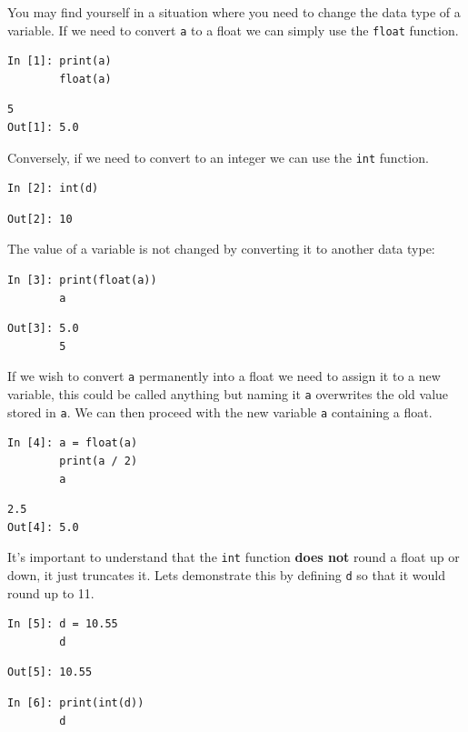 You may find yourself in a situation where you need to change the data type of a variable. If we need to convert \texttt{a} to a float we can simply use the \texttt{float} function.
\begin{lstlisting}[style=PY]
In [1]: print(a)
        float(a)
\end{lstlisting}
\begin{lstlisting}[style=PY, backgroundcolor=\color{white}]
        5
Out[1]: 5.0
\end{lstlisting}
Conversely, if we need to convert to an integer we can use the \texttt{int} function.
\begin{lstlisting}[style=PY]
In [2]: int(d)
\end{lstlisting}
\begin{lstlisting}[style=PY, backgroundcolor=\color{white}]
Out[2]: 10
\end{lstlisting}
The value of a variable is not changed by converting it to another data type:
\begin{lstlisting}[style=PY]
In [3]: print(float(a))
        a
\end{lstlisting}
\begin{lstlisting}[style=PY, backgroundcolor=\color{white}]
Out[3]: 5.0
        5
\end{lstlisting}
If we wish to convert \texttt{a} permanently into a float we need to assign it to a new variable, this could be called anything but naming it \texttt{a} overwrites the old value stored in \texttt{a}. We can then proceed with the new variable \texttt{a} containing a float.
\begin{lstlisting}[style=PY]
In [4]: a = float(a)
        print(a / 2)
        a
\end{lstlisting}
\begin{lstlisting}[style=PY, backgroundcolor=\color{white}]
        2.5
Out[4]: 5.0
\end{lstlisting}
It's important to understand that the \texttt{int} function \textbf{does not} round a float up or down, it just truncates it. Lets demonstrate this by defining \texttt{d} so that it would round up to 11.
\begin{lstlisting}[style=PY]
In [5]: d = 10.55
        d
\end{lstlisting}
\begin{lstlisting}[style=PY, backgroundcolor=\color{white}]
Out[5]: 10.55
\end{lstlisting}
\begin{lstlisting}[style=PY]
In [6]: print(int(d))
        d
\end{lstlisting}
